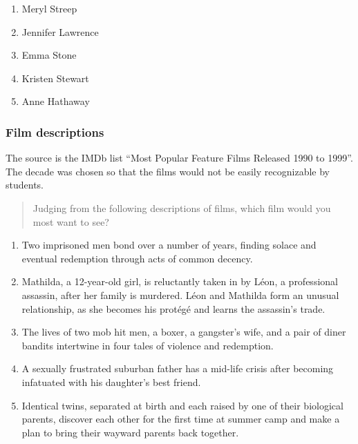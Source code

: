 \documentclass[11pt,letter]{amsart}
\begin{document}
\begin{enumerate}
\item Meryl Streep 

\item Jennifer Lawrence 

\item Emma Stone 

\item Kristen Stewart 

\item Anne Hathaway
\end{enumerate}

\subsubsection{Film descriptions}

The source is the IMDb list ``Most Popular Feature Films Released 1990 to
1999''. The decade was chosen so that the films would not be easily
recognizable by students.

\begin{quotation}
Judging from the following descriptions of films, which film would you most
want to see?
\end{quotation}

\begin{enumerate}
\item Two imprisoned men bond over a number of years, finding solace and
eventual redemption through acts of common decency. 

\item Mathilda, a 12-year-old girl, is reluctantly taken in by L\'eon, a
professional assassin, after her family is murdered. L\'eon and Mathilda
form an unusual relationship, as she becomes his prot\'eg\'e and learns the
assassin's trade. 

\item The lives of two mob hit men, a boxer, a gangster's wife, and a pair
of diner bandits intertwine in four tales of violence and redemption. 

\item A sexually frustrated suburban father has a mid-life crisis after
becoming infatuated with his daughter's best friend. 

\item Identical twins, separated at birth and each raised by one of their
biological parents, discover each other for the first time at summer camp
and make a plan to bring their wayward parents back together.
\end{enumerate}
\end{document}
